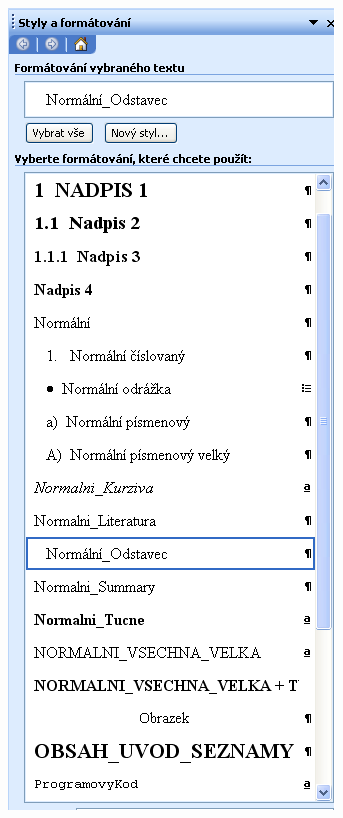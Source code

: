     \begin{figure}
        \centering
        \begin{subfigure}[b]{0.45\textwidth}
          \centering
          \includegraphics[width=\textwidth]{./obrazky/obrazek_1.png}

\end{subfigure}
\end{figure}
